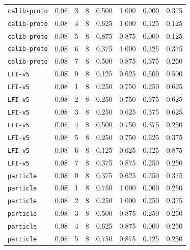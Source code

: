 \documentclass{article}
\begin{document}
\begin{center}
{\begin{tabular}{llllcccc}
\texttt{calib-proto} & 0.08 & 3 & 8 & 0.500 & 1.000 & 0.000 & 0.375 \\
\texttt{calib-proto} & 0.08 & 4 & 8 & 0.625 & 1.000 & 0.125 & 0.125 \\
\texttt{calib-proto} & 0.08 & 5 & 8 & 0.875 & 0.875 & 0.000 & 0.125 \\
\texttt{calib-proto} & 0.08 & 6 & 8 & 0.375 & 1.000 & 0.125 & 0.375 \\
\texttt{calib-proto} & 0.08 & 7 & 8 & 0.500 & 0.875 & 0.375 & 0.250 \\
\texttt{LFI-v5} & 0.08 & 0 & 8 & 0.125 & 0.625 & 0.500 & 0.500 \\
\texttt{LFI-v5} & 0.08 & 1 & 8 & 0.250 & 0.750 & 0.250 & 0.625 \\
\texttt{LFI-v5} & 0.08 & 2 & 8 & 0.250 & 0.750 & 0.375 & 0.625 \\
\texttt{LFI-v5} & 0.08 & 3 & 8 & 0.250 & 0.625 & 0.375 & 0.625 \\
\texttt{LFI-v5} & 0.08 & 4 & 8 & 0.500 & 0.750 & 0.375 & 0.250 \\
\texttt{LFI-v5} & 0.08 & 5 & 8 & 0.250 & 0.750 & 0.625 & 0.375 \\
\texttt{LFI-v5} & 0.08 & 6 & 8 & 0.125 & 0.625 & 0.125 & 0.875 \\
\texttt{LFI-v5} & 0.08 & 7 & 8 & 0.375 & 0.875 & 0.250 & 0.250 \\
\texttt{particle} & 0.08 & 0 & 8 & 0.375 & 0.625 & 0.250 & 0.375 \\
\texttt{particle} & 0.08 & 1 & 8 & 0.750 & 1.000 & 0.000 & 0.250 \\
\texttt{particle} & 0.08 & 2 & 8 & 0.250 & 1.000 & 0.250 & 0.375 \\
\texttt{particle} & 0.08 & 3 & 8 & 0.500 & 0.875 & 0.250 & 0.250 \\
\texttt{particle} & 0.08 & 4 & 8 & 0.625 & 0.875 & 0.000 & 0.250 \\
\texttt{particle} & 0.08 & 5 & 8 & 0.750 & 0.875 & 0.125 & 0.250 \\
\bottomrule
\end{tabular}%
}
\end{center}
\end{document}
